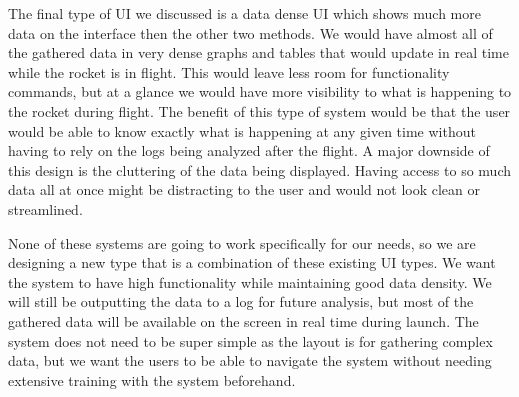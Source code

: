 \documentclass[10pt,draftclsnofoot,onecolumn,retainorgcmds]{IEEEtran}
\begin{document}
The final type of UI we discussed is a data dense UI which shows much more data on the interface then the other two methods. We would have almost all of the gathered data in very dense graphs and tables that would update in real time while the rocket is in flight. This would leave less room for functionality commands, but at a glance we would have more visibility to what is happening to the rocket during flight. The benefit of this type of system would be that the user would be able to know exactly what is happening at any given time without having to rely on the logs being analyzed after the flight. A major downside of this design is the cluttering of the data being displayed. Having access to so much data all at once might be distracting to the user and would not look clean or streamlined. \par

None of these systems are going to work specifically for our needs, so we are designing a new type that is a combination of these existing UI types. We want the system to have high functionality while maintaining good data density. We will still be outputting the data to a log for future analysis, but most of the gathered data will be available on the screen in real time during launch. The system does not need to be super simple as the layout is for gathering complex data, but we want the users to be able to navigate the system without needing extensive training with the system beforehand. \par
\end{document}

